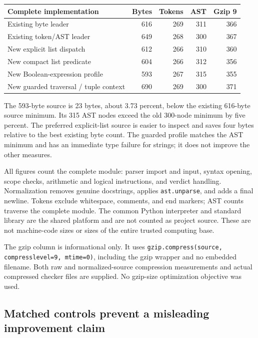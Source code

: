 \documentclass[11pt,letterpaper]{article}
\theoremstyle{definition}\newtheorem{definition}[theorem]{Definition}
\theoremstyle{remark}\newtheorem{remark}[theorem]{Remark}
\begin{document}
\begin{center}\small
\begin{tabular}{lrrrr}
\toprule
Complete implementation & Bytes & Tokens & AST & Gzip 9\\
\midrule
Existing byte leader &616&269&311&366\\
Existing token/AST leader &649&268&300&367\\
\midrule
New explicit list dispatch &612&266&310&360\\
New compact list predicate &604&266&312&356\\
New Boolean-expression profile &593&267&315&355\\
New guarded traversal / tuple context &690&269&300&371\\
\bottomrule
\end{tabular}
\end{center}

The 593-byte source is 23 bytes, about 3.73 percent, below the existing
616-byte source minimum. Its 315 AST nodes exceed the old 300-node
minimum by five percent. The preferred explicit-list source is easier to
inspect and saves four bytes relative to the best existing byte count.
The guarded profile matches the AST minimum and has an immediate type
failure for strings; it does not improve the other measures.

All figures count the complete module: parser import and input, syntax
opening, scope checks, arithmetic and logical instructions, and verdict
handling. Normalization removes genuine docstrings, applies
\texttt{ast.unparse}, and adds a final newline. Tokens exclude whitespace,
comments, and end markers; AST counts traverse the complete module.
The common Python interpreter and standard library are the shared platform
and are not counted as project source. These are not machine-code sizes
or sizes of the entire trusted computing base.

The gzip column is informational only. It uses
\texttt{gzip.compress(source, compresslevel=9, mtime=0)}, including the
gzip wrapper and no embedded filename. Both raw and normalized-source
compression measurements and actual compressed checker files are supplied.
No gzip-size optimization objective was used.

\subsection{Matched controls prevent a misleading improvement claim}
\end{document}
